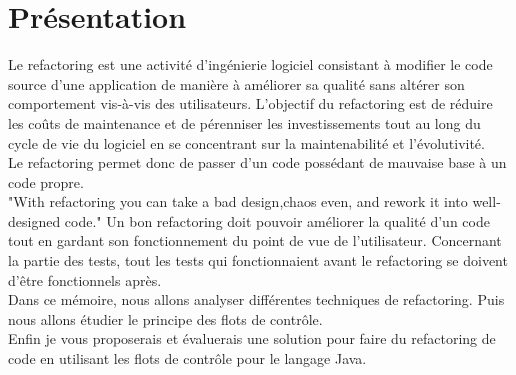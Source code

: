 \documentclass[a4paper,twoside,12pt,openright]{report}
\begin{document}
\section{Présentation}
Le refactoring est une activité d'ingénierie logiciel consistant à modifier le code source d'une application de manière à améliorer sa qualité sans altérer son comportement vis-à-vis des utilisateurs.
L'objectif du refactoring est de réduire les coûts de maintenance et de pérenniser les investissements tout au long du cycle de vie du logiciel en se concentrant sur la maintenabilité et l'évolutivité.\cite{ref1}\\
Le refactoring permet donc de passer d'un code possédant de mauvaise base à un code propre.\\
"With refactoring you can take a bad design,chaos even, and rework it into well-designed code."\cite{ref2}
Un bon refactoring doit pouvoir améliorer la qualité d'un code tout en gardant son fonctionnement du point de vue de l'utilisateur. Concernant la partie des tests, tout les tests qui fonctionnaient avant le refactoring se doivent d'être fonctionnels après.\\
Dans ce mémoire, nous allons analyser différentes techniques de refactoring. Puis nous allons étudier le principe des flots de contrôle.\\ Enfin je vous proposerais et évaluerais une solution pour faire du refactoring de code en utilisant les flots de contrôle pour le langage Java.\cite{ref3}\cite{ref4}


\end{document}

